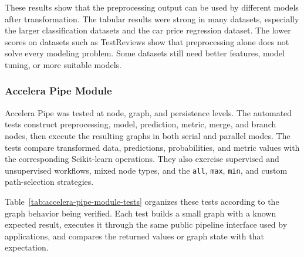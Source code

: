 \documentclass[12pt,a4paper]{report}
\begin{document}
\noindent These results show that the preprocessing output can be used by different
models after transformation. The tabular results were strong in many datasets,
especially the larger classification datasets and the car price regression
dataset. The lower scores on datasets such as  TestReviews show
that preprocessing alone does not solve every modeling problem. Some datasets
still need better features, model tuning, or more suitable models.

\subsubsection{Accelera Pipe Module}

Accelera Pipe was tested at node, graph, and persistence levels. The automated
tests construct preprocessing, model, prediction, metric, merge, and branch
nodes, then execute the resulting graphs in both serial and parallel modes.
The tests compare transformed data, predictions, probabilities, and metric
values with the corresponding Scikit-learn operations. They also exercise
supervised and unsupervised workflows, mixed node types, and the
\texttt{all}, \texttt{max}, \texttt{min}, and custom path-selection strategies.

Table~\ref{tab:accelera-pipe-module-tests} organizes these tests according to
the graph behavior being verified. Each test builds a small graph with a known
expected result, executes it through the same public pipeline interface used by
applications, and compares the returned values or graph state with that
expectation.
\end{document}
